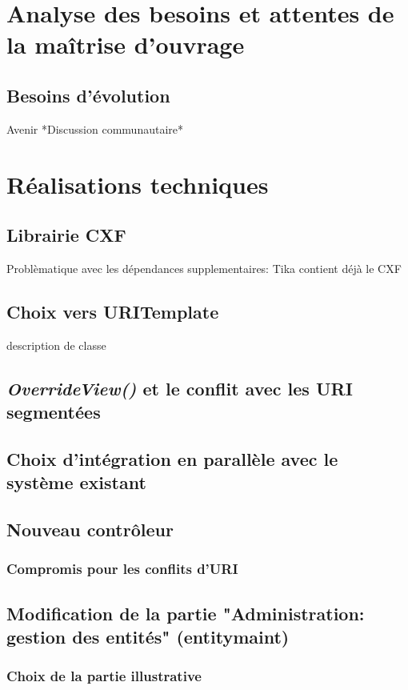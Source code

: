 \newpage

\section{Analyse des besoins et attentes de la maîtrise d'ouvrage}
\subsection{Besoins d'évolution}
Avenir
*Discussion communautaire*

\newpage

\section{Réalisations techniques}

\subsection{Librairie CXF}
Problèmatique avec les dépendances supplementaires: 
Tika contient déjà le CXF
\subsection{Choix vers URITemplate}
description de classe
\subsection{\textit{OverrideView()} et le conflit avec les URI segmentées}
\subsection{Choix d'intégration en parallèle avec le système existant }
\subsection{Nouveau contrôleur}
\subsubsection{Compromis pour les conflits d'URI}

\subsection{Modification de la partie "Administration: gestion des entités"  (entitymaint)  }
\subsubsection{Choix de la partie illustrative}
